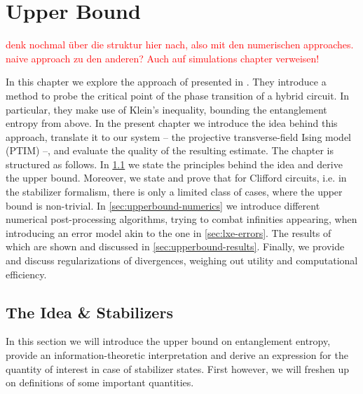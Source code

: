 \chapter{Upper Bound}
\label{ch:rel-ent}

\textcolor{red}{denk nochmal \"uber die struktur hier nach, also mit den
numerischen approaches. naive approach zu den anderen? Auch auf simulations
chapter verweisen!}

In this chapter we explore the approach of
\citeauthor{garrattProbingPostmeasurementEntanglement2023} presented in
\cite{garrattProbingPostmeasurementEntanglement2024}. They introduce a method
to probe the critical point of the phase transition of a hybrid circuit. In
particular, they make use of Klein's inequality, bounding the entanglement
entropy from above. In the present chapter we introduce the idea behind this
approach, translate it to our system -- the projective transverse-field Ising
model (PTIM) --, and evaluate the quality of the resulting estimate. The
chapter is structured as follows. In \cref{sec:upperbound-idea} we state the
principles behind the idea and derive the upper bound. Moreover, we state and
prove that for Clifford circuits, i.e. in the stabilizer formalism, there is
only a limited class of cases, where the upper bound is non-trivial. In
\cref{sec:upperbound-numerics} we introduce different numerical post-processing
algorithms, trying to combat infinities appearing, when introducing an error
model akin to the one in \cref{sec:lxe-errors}. The results of which are shown
and discussed in \cref{sec:upperbound-results}. Finally, we provide and discuss
regularizations of divergences, weighing out utility and
computational efficiency.

%
%
\section{The Idea \& Stabilizers}\label{sec:upperbound-idea}
In this section we will introduce the upper bound on entanglement entropy,
provide an information-theoretic interpretation and derive an expression for
the quantity of interest in case of stabilizer states. First however, we will
freshen up on definitions of some important quantities.
